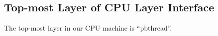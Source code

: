 
\subsection{Top-most Layer of CPU Layer Interface}
\label{chapter:certikos:subsec:pbthread}

The top-most layer in our CPU machine is ``pbthread''.


